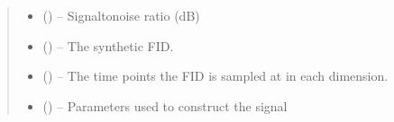 \documentclass[letterpaper,10pt,english]{sphinxmanual}
\begin{document}
\begin{fulllineitems}
\begin{quote}
\begin{description}
\begin{itemize}
\item {} 
\sphinxAtStartPar
{} (\sphinxstyleliteralemphasis{\sphinxupquote{, }}) – Signal\sphinxhyphen{}to\sphinxhyphen{}noise ratio (dB)

\item {} 
\sphinxAtStartPar
{} () – The synthetic FID.

\item {} 
\sphinxAtStartPar
{} (\sphinxstyleliteralemphasis{\sphinxupquote{{[}}}\sphinxstyleliteralemphasis{\sphinxupquote{{]}}}\sphinxstyleliteralemphasis{\sphinxupquote{, }}\sphinxstyleliteralemphasis{\sphinxupquote{{[}}}\sphinxstyleliteralemphasis{\sphinxupquote{, }}\sphinxstyleliteralemphasis{\sphinxupquote{{]}}}) – The time points the FID is sampled at in each dimension.

\item {} 
\sphinxAtStartPar
{} () – Parameters used to construct the signal

\end{itemize}

\end{description}\end{quote}

\end{fulllineitems}

\end{document}
